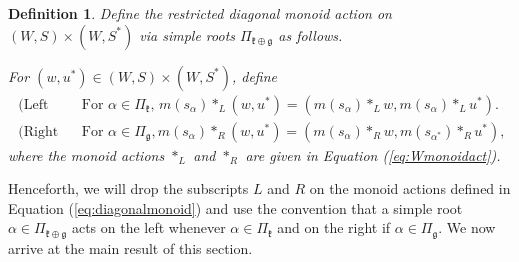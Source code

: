 \documentclass[12pt]{amsart}
\numberwithin{equation}{section}
\newtheorem{dfn}[thm]{Definition}
\newcommand{\fk}{\mbox{${\mathfrak k}$}}
\newcommand{\fg}{\mbox{${\mathfrak g}$}}
\newcommand{\B}{\mathcal{B}}
\newcommand{\Borbitspace}{B_{n-1}\backslash\B_{n}}
\begin{document}
\begin{dfn}\label{d:diagonal}
Define the \emph{restricted diagonal monoid action} on $(W,S)\times (W,S^{*})$ via simple roots $\Pi_{\fk \oplus \fg}$ as follows. 

  
For $(w,u^{*})\in (W,S)\times (W,S^{*})$, define
\begin{equation}\label{eq:diagonalmonoid}
\begin{split}
\mbox{ (Left action)} &\mbox{ For } \alpha\in\Pi_{\fk},\, m(s_{\alpha})*_{L}(w,u^{*})=(m(s_{\alpha})*_{L}w, m(s_{\alpha})*_{L}u^{*}).\\
\mbox{ (Right action)} &\mbox{ For } \alpha\in\Pi_{\fg}, m(s_{\alpha})*_{R}(w,u^{*})=(m(s_{\alpha})*_{R}w, m(s_{\alpha^{*}})*_{R}u^{*}),
\end{split}
\end{equation}
where the monoid actions $*_{L}$ and $*_{R}$ are given in Equation (\ref{eq:Wmonoidact}).
\end{dfn}
Henceforth, we will drop the subscripts $L$ and $R$ on the monoid actions defined in Equation (\ref{eq:diagonalmonoid}) and use the convention that a simple root $\alpha\in\Pi_{\fk \oplus \fg}$ acts on the left whenever $\alpha\in \Pi_{\fk}$ and on the right if $\alpha\in\Pi_{\fg}$.  We now arrive at the main result of this section.  

\end{document}
